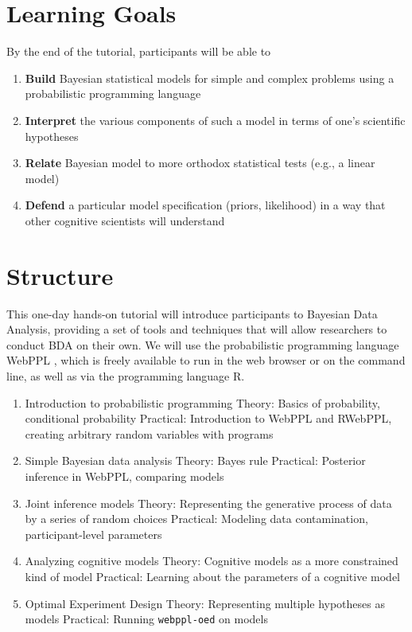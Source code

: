 \documentclass[10pt,letterpaper]{article}
\providecommand{\tightlist}{%
  \setlength{\itemsep}{0pt}\setlength{\parskip}{0pt}}
\begin{document}


\section{Learning Goals}

By the end of the tutorial, participants will be able to 

\begin{enumerate}
\tightlist
\item \textbf{Build} Bayesian statistical models for simple and complex problems using a probabilistic programming language 
\item \textbf{Interpret} the various components of such a model in terms of one's scientific hypotheses 
\item \textbf{Relate} Bayesian model to more orthodox statistical tests (e.g., a linear model) 
\item \textbf{Defend} a particular model specification (priors, likelihood) in a way that other cognitive scientists will understand
\end{enumerate}

\section{Structure}

This one-day hands-on tutorial will introduce participants to Bayesian Data Analysis, providing a set of tools and techniques that will allow researchers to conduct BDA on their own. 
We will use the probabilistic programming language WebPPL \cite{dippl}, which is freely available to run in the web browser or on the command line, as well as via the programming language R. 

\begin{enumerate}
\tightlist
\item Introduction to probabilistic programming
	\subitem Theory: Basics of probability, conditional probability
	\subitem Practical: Introduction to WebPPL and RWebPPL, creating arbitrary random variables with programs
\item Simple Bayesian data analysis
	\subitem Theory: Bayes rule 
	\subitem Practical: Posterior inference in WebPPL, comparing models
\item Joint inference models
	\subitem Theory: Representing the generative process of data by a series of random choices
	\subitem Practical: Modeling data contamination, participant-level parameters
\item Analyzing cognitive models
	\subitem Theory: Cognitive models as a more constrained kind of model
	\subitem Practical: Learning about the parameters of a cognitive model
\item Optimal Experiment Design
	\subitem Theory: Representing multiple hypotheses as models 
	\subitem Practical: Running \texttt{webppl-oed} on models
\end{enumerate}
\end{document}

